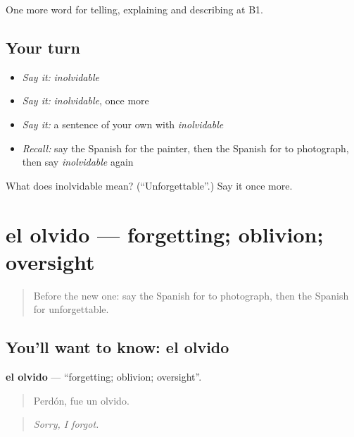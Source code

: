 \begin{grammarlens}[title={What you've built}]
One more word for telling, explaining and describing at B1.
\end{grammarlens}

\subsection*{Your turn}
\begin{itemize}
\raggedright
  \item \emph{Say it:} \emph{inolvidable}
  \item \emph{Say it:} \emph{inolvidable}, once more
  \item \emph{Say it:} a sentence of your own with \emph{inolvidable}
  \item \emph{Recall:} say the Spanish for the painter, then the Spanish for to photograph, then say \emph{inolvidable} again
\end{itemize}

\begin{tcolorbox}[breakable,colback=teal!4,colframe=teal!35!black,title={Before you move on}]
What does inolvidable mean? (\textquotedblleft{}Unforgettable\textquotedblright{}.) Say it once more.
\end{tcolorbox}
\section[el olvido]{el olvido — forgetting; oblivion; oversight}

\label{lesson:ES-C764-olvido}



\begin{quote}
Before the new one: say the Spanish for to photograph, then the Spanish for unforgettable.
\end{quote}

\subsection*{You'll want to know: el olvido}
\textbf{el olvido} — \textquotedblleft{}forgetting; oblivion; oversight\textquotedblright{}.

\begin{quote}
Perdón, fue un olvido.
\end{quote}

\begin{quote}
\emph{Sorry, I forgot.}
\end{quote}

